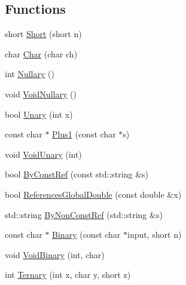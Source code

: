 \subsection*{Functions}
\begin{DoxyCompactItemize}
\item 
short \mbox{\hyperlink{namespacetesting_1_1gmock__more__actions__test_a00503d3168f1123e314c0d42b7e10b88}{Short}} (short n)
\item 
char \mbox{\hyperlink{namespacetesting_1_1gmock__more__actions__test_af69e6906d734a99d60480e4291891d66}{Char}} (char ch)
\item 
int \mbox{\hyperlink{namespacetesting_1_1gmock__more__actions__test_acdd2dd80f777fdb770b513b63064ac19}{Nullary}} ()
\item 
void \mbox{\hyperlink{namespacetesting_1_1gmock__more__actions__test_a061f6d66383a4e793b4d4ca93bd8ca2f}{Void\+Nullary}} ()
\item 
bool \mbox{\hyperlink{namespacetesting_1_1gmock__more__actions__test_aad456ea2ee1b0cb2741b676a34f540a3}{Unary}} (int x)
\item 
const char $\ast$ \mbox{\hyperlink{namespacetesting_1_1gmock__more__actions__test_a986ada18d3311d3fa3a7c33e54e18f33}{Plus1}} (const char $\ast$s)
\item 
void \mbox{\hyperlink{namespacetesting_1_1gmock__more__actions__test_a163632ef644604032f00334fce36de1a}{Void\+Unary}} (int)
\item 
bool \mbox{\hyperlink{namespacetesting_1_1gmock__more__actions__test_a38903b39cda75bfa5c932f4abec7a0ca}{By\+Const\+Ref}} (const std\+::string \&s)
\item 
bool \mbox{\hyperlink{namespacetesting_1_1gmock__more__actions__test_ae2d3dddc96f5657127593f129cd3fc51}{References\+Global\+Double}} (const double \&x)
\item 
std\+::string \mbox{\hyperlink{namespacetesting_1_1gmock__more__actions__test_acfdfdaebbbbfc2f9129f29b10cb42eee}{By\+Non\+Const\+Ref}} (std\+::string \&s)
\item 
const char $\ast$ \mbox{\hyperlink{namespacetesting_1_1gmock__more__actions__test_a853c9f048674a60798b930750b74a1df}{Binary}} (const char $\ast$input, short n)
\item 
void \mbox{\hyperlink{namespacetesting_1_1gmock__more__actions__test_aec71bd163ae67ec97e073bd13a4ac039}{Void\+Binary}} (int, char)
\item 
int \mbox{\hyperlink{namespacetesting_1_1gmock__more__actions__test_ab98b352528a0b72625b4710a6fc648a1}{Ternary}} (int x, char y, short z)

\end{DoxyCompactItemize}
